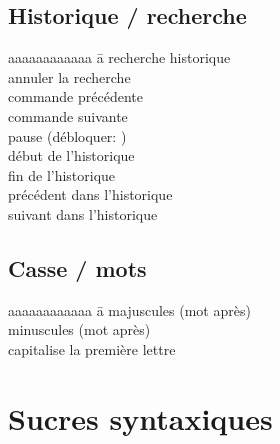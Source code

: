 \documentclass{article}
\let\oldkeys\keys
\renewcommand{\keys}[1]{\small\oldkeys{#1}\normalsize}
\begin{document}
\begin{multicols}{4}
    \subsection*{Historique / recherche}

    \begin{tabbing}
        aaaaaaaaaaaa \= a \kill
         \> recherche historique                \\
         \> annuler la recherche                \\
         \> commande précédente                 \\
         \> commande suivante                   \\
         \> pause (débloquer: ) \\
        \keys{\Alt + <}  \> début de l'historique               \\
        \keys{\Alt + >}  \> fin de l'historique                 \\
          \> précédent dans l'historique         \\
          \> suivant dans l'historique
    \end{tabbing}

    \subsection*{Casse / mots}

    \begin{tabbing}
        aaaaaaaaaaaa \= a \kill
         \> majuscules (mot après)        \\
         \> minuscules (mot après)        \\
         \> capitalise la première lettre
    \end{tabbing}

    \section*{Sucres syntaxiques}


\end{multicols}
\end{document}
